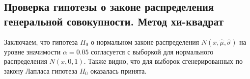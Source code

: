 \subsection{Проверка гипотезы о законе распределения генеральной совокупности. Метод хи-квадрат}
	
	Заключаем, что гипотеза $H_{0}$ о нормальном законе распределения $N(x,\hat{\mu}, \hat{\sigma})$ на уровне значимости $\alpha = 0.05$ согласуется с выборкой для нормального распределения $N(x, 0, 1)$.
	\newline
	Также видно, что для выборок сгенерированных по закону Лапласа гипотеза $H_{0}$ оказалась принята.